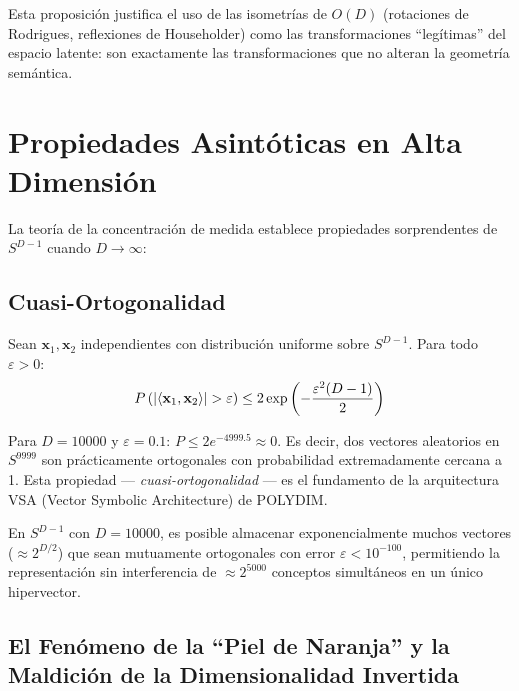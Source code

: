 Esta proposición justifica el uso de las isometrías de $O(D)$ (rotaciones de Rodrigues,
reflexiones de Householder) como las transformaciones ``legítimas'' del espacio
latente: son exactamente las transformaciones que no alteran la geometría semántica.

\section{Propiedades Asintóticas en Alta Dimensión}

La teoría de la concentración de medida establece propiedades sorprendentes
de $S^{D-1}$ cuando $D \to \infty$:

\subsection{Cuasi-Ortogonalidad}

\begin{theorem}[Concentración en $S^{D-1}$]
\label{thm:concentracion}
Sean $\mathbf{x}_1, \mathbf{x}_2$ independientes con distribución uniforme
sobre $S^{D-1}$. Para todo $\varepsilon > 0$:
\begin{equation}
P\left(\abs{\langle \mathbf{x}_1, \mathbf{x}_2 \rangle} > \varepsilon\right) \le 2 \exp\left(-\frac{\varepsilon^2 (D-1)}{2}\right)
\label{eq:concentracion}
\end{equation}
\end{theorem}

Para $D = 10000$ y $\varepsilon = 0.1$: $P \le 2e^{-4999.5} \approx 0$. Es decir,
dos vectores aleatorios en $S^{9999}$ son prácticamente ortogonales con probabilidad
extremadamente cercana a 1. Esta propiedad --- \textit{cuasi-ortogonalidad} --- es
el fundamento de la arquitectura VSA (Vector Symbolic Architecture) de POLYDIM.

\begin{corollary}
\label{cor:vsa_capacity}
En $S^{D-1}$ con $D = 10000$, es posible almacenar exponencialmente muchos
vectores ($\approx 2^{D/2}$) que sean mutuamente ortogonales con error
$\varepsilon < 10^{-100}$, permitiendo la representación sin interferencia de
$\approx 2^{5000}$ conceptos simultáneos en un único hipervector.
\end{corollary}

\subsection{El Fenómeno de la ``Piel de Naranja'' y la Maldición de la Dimensionalidad Invertida}

